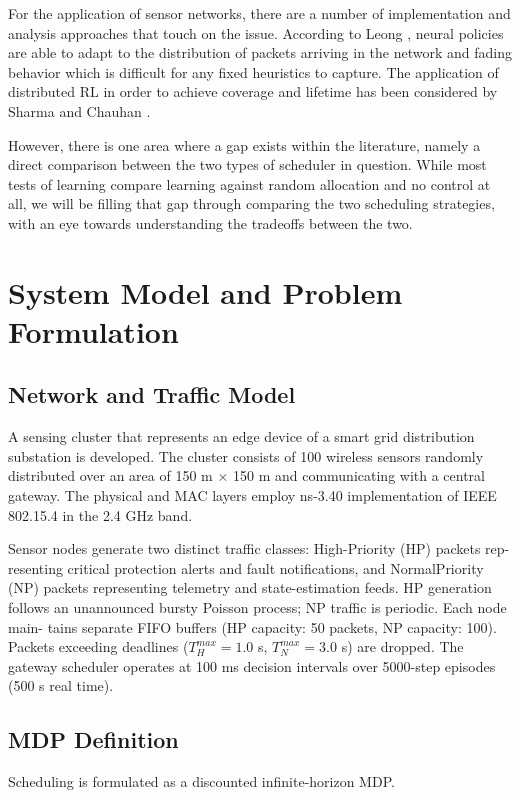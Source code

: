 \documentclass[runningheads,a4paper]{llncs}
\begin{document}
For the application of sensor networks, there are a number of implementation
and analysis approaches that touch on the issue. According to Leong \cite{leong2020automatica}, neural
policies are able to adapt to the distribution of packets arriving in the network
and fading behavior which is difficult for any fixed heuristics to capture. The
application of distributed RL in order to achieve coverage and lifetime has been
considered by Sharma and Chauhan \cite{sharma2020wsn}.

However, there is one area where a gap exists within the literature, namely
a direct comparison between the two types of scheduler in question. While most
tests of learning compare learning against random allocation and no control at
all, we will be filling that gap through comparing the two scheduling strategies,
with an eye towards understanding the tradeoffs between the two.

\section{System Model and Problem Formulation}

\subsection{Network and Traffic Model}
A sensing cluster that represents an edge device of a smart grid distribution
substation is developed. The cluster consists of 100 wireless sensors randomly
distributed over an area of 150 m × 150 m and communicating with a central
gateway. The physical and MAC layers employ ns-3.40 implementation of IEEE
802.15.4 in the 2.4 GHz band.

Sensor nodes generate two distinct traffic classes: High-Priority (HP) packets rep-
resenting critical protection alerts and fault notifications, and NormalPriority (NP)
packets representing telemetry and state-estimation feeds. HP generation follows
an unannounced bursty Poisson process; NP traffic is periodic. Each node main-
tains separate FIFO buffers (HP capacity: 50 packets, NP capacity: 100). Packets
exceeding deadlines ($T_H^{max} = 1.0$ s, $T_N^{max} = 3.0$ s) are dropped. The
gateway scheduler operates at 100 ms decision intervals over 5000-step episodes
(500 s real time).

\subsection{MDP Definition}
Scheduling is formulated as a discounted infinite-horizon MDP.
\end{document}
